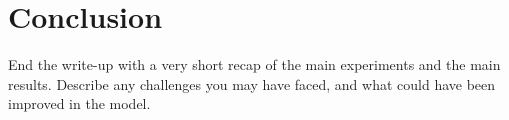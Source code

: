\documentclass[11pt]{article}
\begin{document}
%
%
%
%
%


\section{Conclusion}

End the write-up with a very short recap of the main experiments and the main results. Describe any challenges you may have faced, and what could have been improved in the model.



\end{document}
